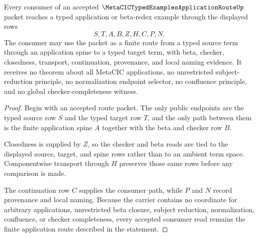 \begin{theorem}
\label{thm:metacic-typedexamples-application-route-soundness}
Every consumer of an accepted $\MetaCICTypedExamplesApplicationRouteUp$ packet reaches a typed application or beta-redex example through the displayed rows
$$
S,T,A,B,Z,H,C,P,N.
$$
The consumer may use the packet as a finite route from a typed source term through an application spine to a typed target term, with beta, checker, closedness, transport, continuation, provenance, and local naming evidence. It receives no theorem about all MetaCIC applications, no unrestricted subject-reduction principle, no normalization endpoint selector, no confluence principle, and no global checker-completeness witness.
\end{theorem}
\begin{proof}
Begin with an accepted route packet. The only public endpoints are the typed source row $S$ and the typed target row $T$, and the only path between them is the finite application spine $A$ together with the beta and checker row $B$.

Closedness is supplied by $Z$, so the checker and beta reads are tied to the displayed source, target, and spine rows rather than to an ambient term space. Componentwise transport through $H$ preserves those same rows before any comparison is made.

The continuation row $C$ supplies the consumer path, while $P$ and $N$ record provenance and local naming. Because the carrier contains no coordinate for arbitrary applications, unrestricted beta closure, subject reduction, normalization, confluence, or checker completeness, every accepted consumer read remains the finite application route described in the statement.
\end{proof}

\begin{closurestatus}{\MetaCICTypedExamplesApplicationRouteUp}
  \theoryclosure{\seedClosure}
  \formalstatus{\unformalizedV}
\end{closurestatus}
